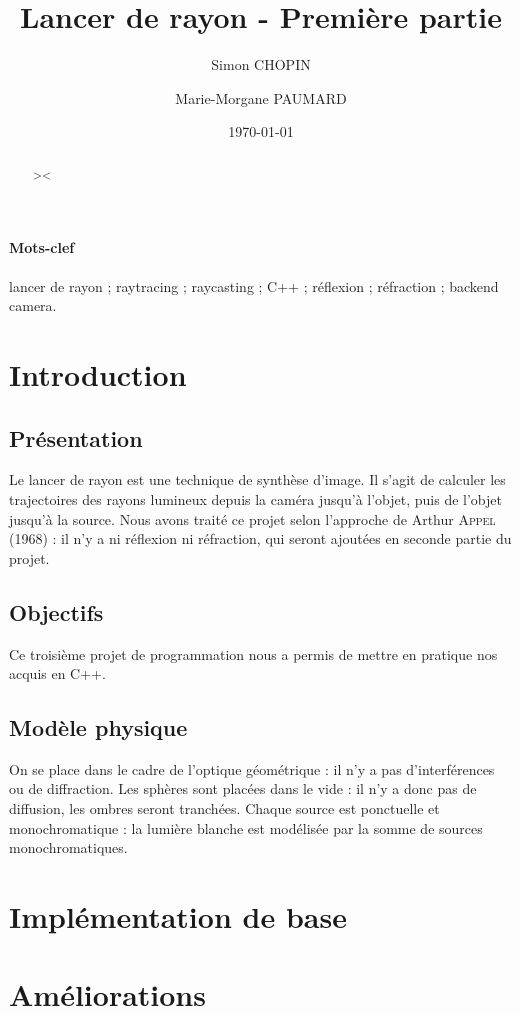 \documentclass{article}
\title{Lancer de rayon - Première partie}
\author{Simon CHOPIN \and Marie-Morgane PAUMARD}
\date{\today}
\begin{document}
\maketitle
\tableofcontents
\begin{abstract}
><
\end{abstract}

\paragraph{Mots-clef}
lancer de rayon ; raytracing ; raycasting ; C++ ; réflexion ; réfraction ; backend camera.

\section{Introduction}
\subsection{Présentation}
Le lancer de rayon est une technique de synthèse d’image. Il s’agit de calculer
les trajectoires des rayons lumineux depuis la caméra jusqu’à l’objet, puis de
l’objet jusqu’à la source.
Nous avons traité ce projet selon l'approche de Arthur \textsc{Appel} (1968) :
il n'y a ni réflexion ni réfraction, qui seront ajoutées en seconde partie du
projet.

\subsection{Objectifs}
Ce troisième projet de programmation nous a permis de mettre en pratique nos
acquis en C++.

\subsection{Modèle physique}
On se place dans le cadre de l'optique géométrique : il n'y a pas
d'interférences ou de diffraction. Les sphères sont placées dans le vide : il
n'y a donc pas de diffusion, les ombres seront tranchées. Chaque source est
ponctuelle et monochromatique : la lumière blanche est modélisée par la somme
de sources monochromatiques.

\section{Implémentation de base}


\section{Améliorations}
\end{document}
